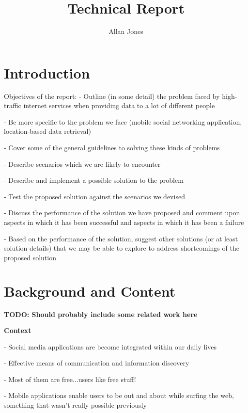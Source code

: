 \documentclass{article}
\title{Technical Report}
\author{Allan Jones}
\begin{document}
	\maketitle

\section{Introduction} %
\label{sec:introduction}

Objectives of the report:
- Outline (in some detail) the problem faced by high-traffic internet services when providing data to a lot of different people

- Be more specific to the problem we face (mobile social networking application, location-based data retrieval)

- Cover some of the general guidelines to solving these kinds of problems

- Describe scenarios which we are likely to encounter

- Describe and implement a possible solution to the problem

- Test the proposed solution against the scenarios we devised

- Discuss the performance of the solution we have proposed and comment upon aspects in which it has been successful and aspects in which it has been a failure

- Based on the performance of the solution, suggest other solutions (or at least solution details) that we may be able to explore to address shortcomings of the proposed solution 


\section{Background and Content} %
\label{sec:background_and_content}

\textbf{TODO: Should probably include some related work here}

\textbf{Context}

- Social media applications are become integrated within our daily lives

- Effective means of communication and information discovery

- Most of them are free...users like free stuff!

- Mobile applications enable users to be out and about while surfing the web, something that wasn't really possible previously
\end{document}

